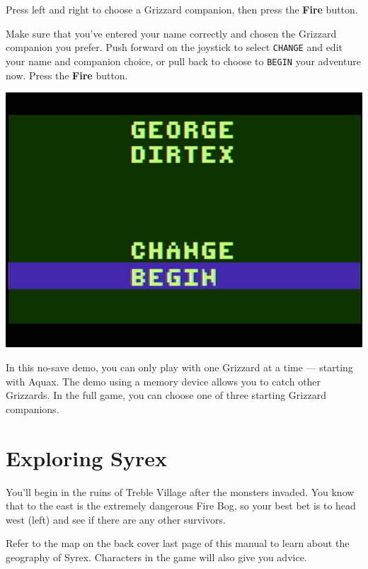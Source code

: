 \documentclass[10pt,twocolumn,openany,article]{memoir}
\begin{document}
Press left  and right  to choose  a Grizzard  companion, then  press the
\textbf{Fire} button.

Make  sure  that you've  entered  your  name  correctly and  chosen  the
Grizzard companion  you prefer. Push  forward on the joystick  to select
\texttt{CHANGE} and edit your name and companion choice, or pull back to
choose    to   \texttt{BEGIN}    your   adventure    now.   Press    the
\textbf{Fire} button.

\begin{center}
  \includegraphics[width=\columnwidth]{../Manual/ConfirmNewGameNTSC.png}
\end{center}

\fi
\fi
\ifdefined\NOSAVE

In this no-save demo, you can only  play with one Grizzard at a time ---
starting with Aquax. The demo using  a memory device allows you to catch
other Grizzards. In the full game,  you can choose one of three starting
Grizzard companions.

\fi

\section{Exploring Syrex}

You'll begin in the ruins of  Treble Village after the monsters invaded.
You know that to  the east is the extremely dangerous  Fire Bog, so your
best  bet   is  to  head   west  (left)  and   see  if  there   are  any
other survivors.

Refer to  the map on  the \ifdefined\ATARIAGESAVE back cover  \else last
page  \fi{} of  this  manual  to learn  about  the  geography of  Syrex.
Characters in the game will also give you advice.
\end{document}
